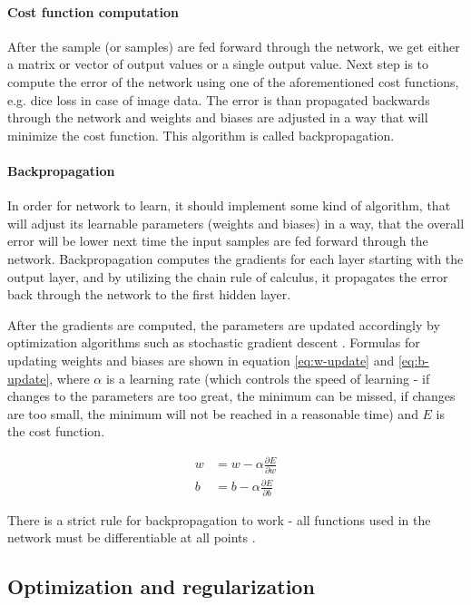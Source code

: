 \paragraph{Cost function computation}
After the sample (or samples) are fed forward through the network, we get either a matrix or vector of output values or a single output value. Next step is to compute the error of the network using one of the aforementioned cost functions, e.g. dice loss in case of image data. The error is than propagated backwards through the network and weights and biases are adjusted in a way that will minimize the cost function. This algorithm is called backpropagation.

\paragraph{Backpropagation}
In order for network to learn, it should implement some kind of algorithm, that will adjust its learnable parameters (weights and biases) in a way, that the overall error will be lower next time the input samples are fed forward through the network. Backpropagation computes the gradients for each layer starting with the output layer, and by utilizing the chain rule of calculus, it propagates the error back through the network to the first hidden layer.

After the gradients are computed, the parameters are updated accordingly by optimization algorithms such as stochastic gradient descent \cite{Santosh2022-2}. Formulas for updating weights and biases are shown in equation \ref{eq:w-update} and \ref{eq:b-update}, where $\alpha$ is a learning rate (which controls the speed of learning - if changes to the parameters are too great, the minimum can be missed, if changes are too small, the minimum will not be reached in a reasonable time) and $E$ is the cost function.

\begin{align}
\label{eq:w-update}
w &= w - \alpha \frac{\partial E}{\partial w} \\
\label{eq:b-update}
b &=  b - \alpha \frac{\partial E}{\partial b}
\end{align}

There is a strict rule for backpropagation to work - all functions used in the network must be differentiable at all points \cite{Rumelhart1986, Santosh2022-2}.

\subsection{Optimization and regularization}

